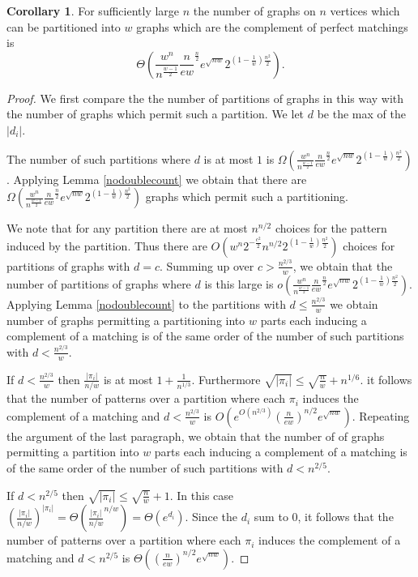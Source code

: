 \documentclass[12pt]{article}
\theoremstyle{definition}
\newtheorem{corollary}[theorem]{Corollary}
\begin{document}
\begin{corollary}\label{cpmcountall}
For sufficiently large $n$ the number of graphs on $n$ vertices which can be partitioned into $w$  graphs which  are the complement of perfect matchings 
is $$\Theta\left(\frac{w^n}{n^\frac{w-1}{2}}\frac{n}{ew}^\frac{n}{2}e^{\sqrt{nw}}2^{(1-\frac{1}{w})\frac{n^2}{2}}\right).$$
\end{corollary}

\begin{proof} 

We first compare the the number of partitions of graphs in this way with the number of graphs which permit such a partition.  
We let $d$ be the max of the $|d_i|$.

The number of such partitions where $d$ is at most $1$ is
$\Omega(\frac{w^n}{n^\frac{w-1}{2}}\frac{n}{ew}^\frac{n}{2}e^{\sqrt{nw}}2^{(1-\frac{1}{w})\frac{n^2}{2}})$. 
 Applying Lemma \ref{nodoublecount} we obtain that  there are 
$\Omega(\frac{w^n}{n^\frac{w-1}{2}}\frac{n}{ew}^\frac{n}{2}e^{\sqrt{nw}}2^{(1-\frac{1}{w})\frac{n^2}{2}})$ graphs which permit 
such a partitioning. 


We note that for any partition there are at most $n^{n/2}$ choices for the pattern induced by the partition. 
Thus  there are $O(w^{n}2^{-\frac{c^2}{2}}n^{n/2} 2^{(1-\frac{1}{w})\frac{n^2}{2}})$ choices  for  partitions of graphs with $d=c$. Summing up over  $c> \frac{n^{2/3}}{w}$, we obtain that the number of  partitions of graphs where $d$ is this large is 
$o(\frac{w^n}{n^\frac{w-1}{2}}\frac{n}{ew}^\frac{n}{2}e^{\sqrt{nw}}2^{(1-\frac{1}{w})\frac{n^2}{2}})$. 
Applying Lemma \ref{nodoublecount}  to the  partitions with $d \le  \frac{n^{2/3}}{w}$ we obtain number of graphs permitting  a partitioning  
into $w$ parts each inducing a complement of a matching is of the same order of the number of such partitions with $d<\frac{n^{2/3}}{w}$. 

If $d<\frac{n^{2/3}}{w}$ then $\frac{|\pi_i|}{n/w}$ is at most $1+\frac{1}{n^{1/3}}$.
Furthermore $\sqrt{|\pi_i|} \le \sqrt{\frac{n}{w}}+n^{1/6}$. it follows that the number of patterns over  a partition where each $\pi_i$ induces the 
complement of a matching and $d<\frac{n^{2/3}}{w}$  is $O(e^{O(n^{2/3})}(\frac{n}{ew})^{n/2}e^{\sqrt{nw}})$. Repeating the argument of the last paragraph,
we obtain  that the number of  of graphs permitting  a partition  
into $w$ parts each inducing a complement of a matching is of the same order of the number of such partitions with $d<n^{2/5}$. 

If $d<n^{2/5}$   then  $\sqrt{|\pi_i|} \le \sqrt{\frac{n}{w}}+1$. In this case $(\frac{|\pi_i|}{n/w})^{|\pi_i|}=\Theta(\frac{|\pi_i|}{n/w}^{n/w})=\Theta(e^{d_i})$.
Since the $d_i$ sum to 0, it follows that the number of patterns over  a partition where each $\pi_i$ induces the 
complement of a matching  and $d< n^{2/5}$ is $\Theta((\frac{n}{ew})^{n/2}e^{\sqrt{nw}})$. 


\end{proof}
\end{document}
